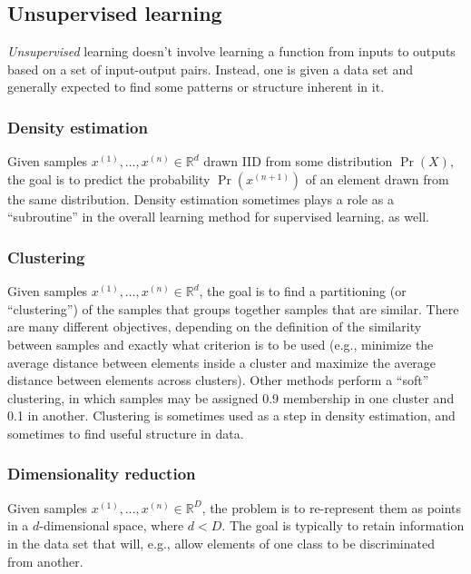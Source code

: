 \documentclass[11pt]{article}
\newcommand\ex[2]{#1^{(#2)}}
\newcommand{\R}{\mathbb{R}}
\begin{document}
\subsection{Unsupervised learning}
\label{sec:intro_unsupervised}

{\em Unsupervised} learning doesn't
involve learning a function from inputs to outputs based on a set of
input-output pairs.  Instead, one is given a data set and generally
expected to find some patterns or structure inherent in it.

\subsubsection{Density estimation}

Given samples $\ex{x}{1}, \ldots, \ex{x}{n} \in \R^d$ drawn IID 
from some distribution $\Pr(X)$, the goal is to predict the probability
$\Pr(\ex{x}{n+1})$ of an element drawn from the same distribution.
Density estimation sometimes plays a role as a ``subroutine'' in the
overall learning method for supervised learning, as well.


\subsubsection{Clustering}

Given samples $\ex{x}{1}, \ldots, \ex{x}{n} \in \R^d$, the goal is to
find a partitioning (or ``clustering'') of the samples that groups together samples that are
similar.  There are many different objectives, depending on the
definition of the similarity between samples and exactly what
criterion is to be used (e.g., minimize the average distance between
elements inside a cluster and maximize the average distance between
elements across clusters).  Other methods perform a ``soft''
clustering, in which samples may be assigned 0.9 membership in one
cluster and 0.1 in another.  Clustering is sometimes used as a step in
density estimation, and sometimes to find useful structure in data.

\subsubsection{Dimensionality reduction}

Given samples $\ex{x}{1}, \ldots, \ex{x}{n} \in \R^D$, the problem is to
re-represent them as points in a $d$-dimensional space, where $d <
D$.  The goal is typically to retain information in the data set that
will, e.g., allow elements of one class to be discriminated from
another.
\end{document}
